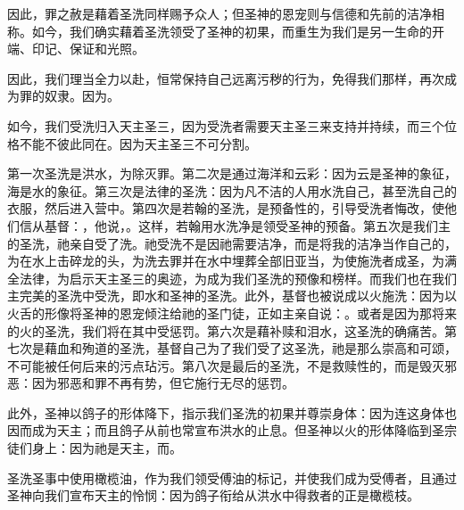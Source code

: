 因此，罪之赦是藉着圣洗同样赐予众人；但圣神的恩宠则与信德和先前的洁净相称。如今，我们确实藉着圣洗领受了圣神的初果，而重生为我们是另一生命的开端、印记、保证和光照。\par

因此，我们理当全力以赴，恒常保持自己远离污秽的行为，免得我们那样，再次成为罪的奴隶。因为。\par

如今，我们受洗归入天主圣三，因为受洗者需要天主圣三来支持并持续，而三个位格不能不彼此同在。因为天主圣三不可分割。\par

第一次圣洗是洪水，为除灭罪。第二次是通过海洋和云彩：因为云是圣神的象征，海是水的象征。第三次是法律的圣洗：因为凡不洁的人用水洗自己，甚至洗自己的衣服，然后进入营中。第四次是若翰的圣洗，是预备性的，引导受洗者悔改，使他们信从基督：，他说，。这样，若翰用水洗净是领受圣神的预备。第五次是我们主的圣洗，祂亲自受了洗。祂受洗不是因祂需要洁净，而是将我的洁净当作自己的，为在水上击碎龙的头，为洗去罪并在水中埋葬全部旧亚当，为使施洗者成圣，为满全法律，为启示天主圣三的奥迹，为成为我们圣洗的预像和榜样。而我们也在我们主完美的圣洗中受洗，即水和圣神的圣洗。此外，基督也被说成以火施洗：因为以火舌的形像将圣神的恩宠倾注给祂的圣门徒，正如主亲自说：。或者是因为那将来的火的圣洗，我们将在其中受惩罚。第六次是藉补赎和泪水，这圣洗的确痛苦。第七次是藉血和殉道的圣洗，基督自己为了我们受了这圣洗，祂是那么崇高和可颂，不可能被任何后来的污点玷污。第八次是最后的圣洗，不是救赎性的，而是毁灭邪恶：因为邪恶和罪不再有势，但它施行无尽的惩罚。\par

此外，圣神以鸽子的形体降下，指示我们圣洗的初果并尊崇身体：因为连这身体也因而成为天主；而且鸽子从前也常宣布洪水的止息。但圣神以火的形体降临到圣宗徒们身上：因为祂是天主，而。\par

圣洗圣事中使用橄榄油，作为我们领受傅油的标记，并使我们成为受傅者，且通过圣神向我们宣布天主的怜悯：因为鸽子衔给从洪水中得救者的正是橄榄枝。\par

